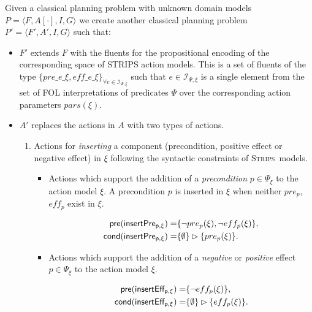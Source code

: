 \documentclass{article}
\newcommand{\tup}[1]{{\langle #1 \rangle}}
\newcommand{\pre}{\mathsf{pre}}     %
\newcommand{\cond}{\mathsf{cond}}   %
\newcommand{\strips}{\textsc{Strips}}
\begin{document}
Given a classical planning problem with unknown domain models $P=\tup{F,A[\cdot],I,G}$ we create another classical planning problem $P'=\tup{F',A',I,G}$ such that:
\begin{itemize}
\item $F'$ extends $F$ with the fluents for the propositional encoding of the corresponding space of STRIPS action models. This is a set of fluents of the type $\{pre\_e\_\xi, eff\_e\_\xi\}_{\forall e\in{\mathcal I}_{\Psi,\xi}}$ such that $e\in{\mathcal I}_{\Psi,\xi}$ is a single element from the set of FOL interpretations of predicates $\Psi$ over the corresponding action parameters $pars(\xi)$. 

\item $A'$ replaces the actions in $A$ with two types of actions.
\begin{enumerate}
\item Actions for {\em inserting} a component (precondition, positive effect or negative effect) in $\xi$ following the syntactic constraints of \strips\ models. 
\begin{itemize}
\item Actions which support the addition of a {\em precondition} $p\in \Psi_{\xi}$ to the action model $\xi$. A precondition $p$ is inserted in $\xi$ when neither $pre_p$, $eff_p$ exist in $\xi$.

\begin{small}
\begin{align*}
\hspace*{7pt}\pre(\mathsf{insertPre_{p,\xi}})=&\{\neg pre_{p}(\xi), \neg eff_{p}(\xi)\},\\
\cond(\mathsf{insertPre_{p,\xi}})=&\{\emptyset\}\rhd\{pre_{p}(\xi)\}.
\end{align*}
\end{small}

\item Actions which support the addition of a {\em negative} or {\em positive} effect $p\in \Psi_{\xi}$ to the action model $\xi$. 

\begin{small}
\begin{align*}
\hspace*{7pt}\pre(\mathsf{insertEff_{p,\xi}})=&\{\neg eff_{p}(\xi)\},\\
\cond(\mathsf{insertEff_{p,\xi}})=&\{\emptyset\}\rhd\{eff_{p}(\xi)\}.
\end{align*}
\end{small}
\end{itemize}


\end{enumerate}
\end{itemize}
\end{document}
